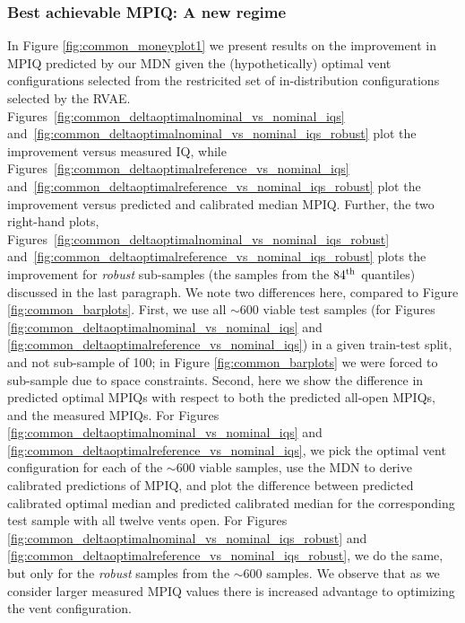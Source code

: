 \subsubsection{Best achievable MPIQ: A new regime}\label{results_bestmpiq}
In Figure \ref{fig:common_moneyplot1} we present results on the improvement in MPIQ predicted by our MDN given the (hypothetically) optimal vent configurations selected from the restricited set of in-distribution configurations selected by the RVAE.  Figures~\ref{fig:common_deltaoptimalnominal_vs_nominal_iqs} and~\ref{fig:common_deltaoptimalnominal_vs_nominal_iqs_robust} plot the improvement versus measured IQ, while Figures~\ref{fig:common_deltaoptimalreference_vs_nominal_iqs} and~\ref{fig:common_deltaoptimalreference_vs_nominal_iqs_robust} plot the improvement versus predicted and calibrated median MPIQ. Further, the two right-hand plots, Figures~\ref{fig:common_deltaoptimalnominal_vs_nominal_iqs_robust} and~\ref{fig:common_deltaoptimalreference_vs_nominal_iqs_robust} plots the improvement for {\it robust} sub-samples (the samples from the $84^{\rm th}$ quantiles) discussed in the last paragraph.
We note two differences here, compared to Figure \ref{fig:common_barplots}. First, we use all $\sim600$ viable test samples (for Figures \ref{fig:common_deltaoptimalnominal_vs_nominal_iqs} and \ref{fig:common_deltaoptimalreference_vs_nominal_iqs}) in a given train-test split, and not sub-sample of 100; in Figure \ref{fig:common_barplots} we were forced to sub-sample due to space constraints. Second, here we show the difference in predicted optimal MPIQs with respect to both the predicted all-open MPIQs, and the measured MPIQs. For Figures \ref{fig:common_deltaoptimalnominal_vs_nominal_iqs} and \ref{fig:common_deltaoptimalreference_vs_nominal_iqs}, we pick the optimal vent configuration for each of the $\sim600$ viable samples, use the MDN to derive calibrated predictions of MPIQ, and plot the difference between predicted calibrated optimal median and predicted calibrated median for the corresponding test sample with all twelve vents open. For Figures \ref{fig:common_deltaoptimalnominal_vs_nominal_iqs_robust} and \ref{fig:common_deltaoptimalreference_vs_nominal_iqs_robust}, we do the same, but only for the \textit{robust} samples from the $\sim600$ samples. We observe that as we consider larger measured MPIQ values there is increased advantage to optimizing the vent configuration.


